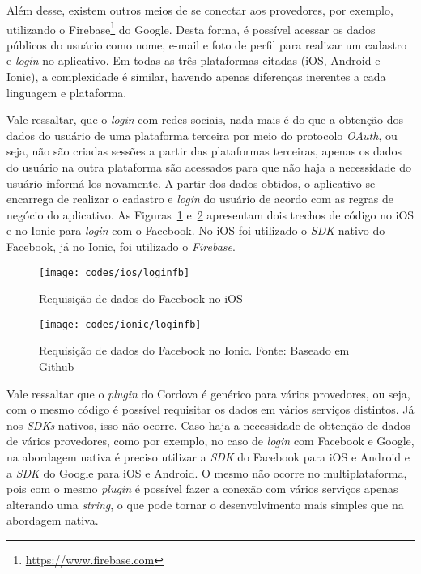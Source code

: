Além desse, existem outros meios de se conectar aos provedores, por exemplo, utilizando o 
Firebase\footnote{\url{https://www.firebase.com}} do Google. Desta forma, é possível acessar os dados públicos do usuário como nome, e-mail e foto de perfil para realizar um cadastro e \textit{login} no aplicativo.
Em todas as três plataformas citadas (iOS, Android e Ionic), a complexidade é similar, havendo apenas diferenças inerentes a cada linguagem e plataforma. 

Vale ressaltar, que o \textit{login} com redes sociais, nada mais é do que a obtenção dos dados do usuário de uma plataforma terceira por meio do protocolo \textit{OAuth}, 
ou seja, não são criadas sessões a partir das plataformas terceiras, apenas os dados do usuário na outra plataforma são acessados para que não haja a necessidade do usuário informá-los novamente. A partir dos dados 
obtidos, o aplicativo se encarrega de realizar o cadastro e \textit{login} do usuário de acordo com as regras de negócio do aplicativo. 
As Figuras~\ref{fig:loginfb-ios} e~\ref{fig:loginfb-ionic} apresentam dois trechos de código no iOS e no Ionic para \textit{login} com o Facebook. No iOS foi utilizado o \textit{SDK} nativo do Facebook, 
já no Ionic, foi utilizado o \textit{Firebase}. 

\begin{figure}[H]
	\centering
	\texttt{[image: codes/ios/loginfb]}
	\caption[Requisição de dados do Facebook no iOS]{Requisição de dados do Facebook no iOS}
	\label{fig:loginfb-ios}
\end{figure}

\begin{figure}[H]
	\centering
	\texttt{[image: codes/ionic/loginfb]}
	\caption[Requisição de dados do Facebook no Ionic]{Requisição de dados do Facebook no Ionic. Fonte: Baseado em Github\protect\footnotemark}
	\label{fig:loginfb-ionic}
\end{figure}


Vale ressaltar que o \textit{plugin} do Cordova é genérico para vários provedores, ou seja, com o mesmo código é possível requisitar os dados em vários serviços distintos. Já nos \textit{SDKs} nativos, isso não ocorre.
Caso haja a necessidade de obtenção de dados de vários provedores, como por exemplo, no caso de \textit{login} com Facebook e Google, na abordagem nativa é preciso utilizar a \textit{SDK} do Facebook para iOS e Android
e a \textit{SDK} do Google para iOS e Android. O mesmo não ocorre no multiplataforma, pois com o mesmo \textit{plugin} é possível fazer a conexão com vários serviços apenas alterando uma \textit{string}, 
o que pode tornar o desenvolvimento mais simples que na abordagem nativa.

